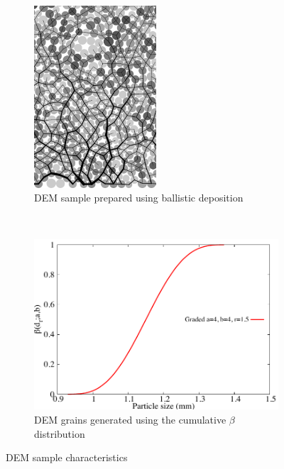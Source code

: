 \begin{figure}[tbhp]
\centering
\begin{subfigure}[b]{0.95\textwidth}
\centering
\includegraphics[width=0.5\textwidth]{a4b4r18}
\caption{DEM sample prepared using ballistic deposition}
\label{fig:a4b4r18}
\end{subfigure}
\\
\begin{subfigure}[b]{0.95\textwidth}
\centering
\includegraphics[width=\textwidth]{PSD}
\caption{DEM grains generated using the cumulative $\beta$ distribution}
\label{fig:PSD}
\end{subfigure}
\caption{DEM sample characteristics}
\label{fig:DEM_Sample}
\end{figure}


